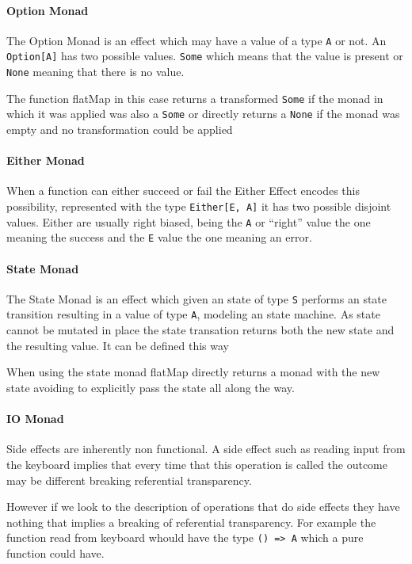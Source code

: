 \documentclass[../main.tex]{subfiles}
\begin{document}
\paragraph{Option Monad}
The Option Monad is an effect which may have a value of a type \texttt{A} or
not. An \texttt{Option[A]} has two possible values. \texttt{Some} which means
that the value is present or \texttt{None} meaning that there is no value.

The function flatMap in this case returns a transformed \texttt{Some} if the monad in which
it was applied was also a \texttt{Some} or directly returns a \texttt{None} if
the monad was empty and no transformation could be applied

\paragraph{Either Monad}
When a function can either succeed or fail the Either Effect encodes this
possibility, represented with the type \texttt{Either[E, A]} it has two possible
disjoint values. Either are usually right biased, being the \texttt{A} or
``right'' value the one meaning the success and the \texttt{E} value the one
meaning an error.

\paragraph{State Monad}
The State Monad is an effect which given an state of type \texttt{S} performs an state
transition resulting in a value of type \texttt{A}, modeling an state machine.
As state cannot be mutated in place the state transation returns both the new
state and the resulting value. It can be defined this way

When using the state monad flatMap directly returns a monad with the new state
avoiding to explicitly pass the state all along the way.

\paragraph{IO Monad}
Side effects are inherently non functional. A side effect such as reading input
from the keyboard implies that every time that this operation is called the
outcome may be different breaking referential transparency.

However if we look to the description of operations that do side effects they
have nothing that implies a breaking of referential transparency. For example
the function read from keyboard whould have the type \texttt{() => A} which a
pure function could have.
\end{document}
